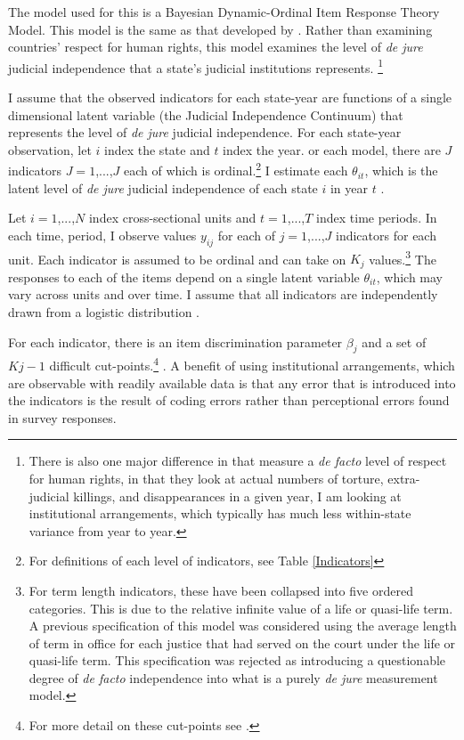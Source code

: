 \documentclass[JohnsonMADraft2]{subfiles}
\begin{document}
The model used for this is a Bayesian Dynamic-Ordinal Item Response Theory Model.  This model is the same as that developed by \citet{Schnakenberg2014}.  Rather than examining countries' respect for human rights, this model examines the level of \textit{de jure} judicial independence that a state's judicial institutions represents. \footnote{There is also one major difference in that \citeauthor{Schnakenberg2014} measure a \textit{de facto} level of respect for human rights, in that they look at actual numbers of torture, extra-judicial killings, and disappearances in a given year, I am looking at institutional arrangements, which typically has much less within-state variance from year to year.}	
	
I assume that the observed indicators for each state-year are functions of a single dimensional latent variable (the Judicial Independence Continuum) that represents the level of \textit{de jure} judicial independence.  For each state-year observation, let $i$ index the state and $t$ index the year.  or each model, there are $J$ indicators $J=1$,...,$J$ each of which is ordinal.\footnote{For definitions of each level of indicators, see Table \ref{Indicators}} I estimate each $\theta_{it}$, which is the latent level of \textit{de jure} judicial independence of each state $i$ in year $t$ \citep[7]{Schnakenberg2014}.

Let $i=1$,...,$N$ index cross-sectional units and $t=1$,...,$T$ index time periods.  In each time, period, I observe values $y_{ij}$ for each of $j=1$,...,$J$ indicators for each unit.  Each indicator is assumed to be ordinal and can take on $K_j$ values.\footnote{For term length indicators, these have been collapsed into five ordered categories.  This is due to the relative infinite value of a life or quasi-life term.  A previous specification of this model was considered using the average length of term in office for each justice that had served on the court under the life or quasi-life term.  This specification was rejected as introducing a questionable degree of \textit{de facto} independence into what is a purely \textit{de jure} measurement model.}  The responses to each of the items depend on a single latent variable $\theta_{it}$, which may vary across units and over time. I assume that all indicators are independently drawn from a logistic distribution \citep[7]{Schnakenberg2014}. 

For each indicator, there is an item discrimination parameter $\beta_j$ and a set of $Kj-1$ difficult cut-points.\footnote{For more detail on these cut-points see \citep{Treier2008,Schnakenberg2014}.  } \citep[7]{Schnakenberg2014}.  A benefit of using institutional arrangements, which are observable with readily available data is that any error that is introduced into the indicators is the result of coding errors rather than perceptional errors found in survey responses.  
\end{document}
